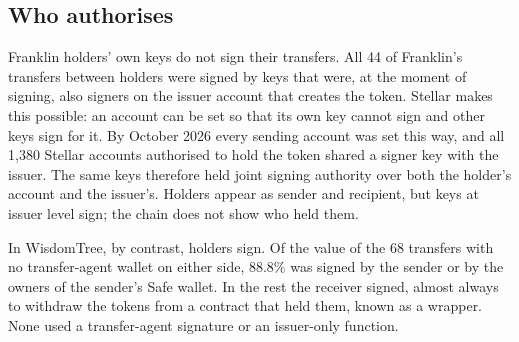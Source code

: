 \documentclass[12pt,a4paper]{article}
\begin{document}
\subsection{Who authorises}
Franklin holders' own keys do not sign their transfers. All 44 of Franklin's transfers between holders were signed by keys that were, at the moment of signing, also signers on the issuer account that creates the token. Stellar makes this possible: an account can be set so that its own key cannot sign and other keys sign for it. By October 2026 every sending account was set this way, and all 1{,}380 Stellar accounts authorised to hold the token shared a signer key with the issuer. The same keys therefore held joint signing authority over both the holder's account and the issuer's. Holders appear as sender and recipient, but keys at issuer level sign; the chain does not show who held them.

In WisdomTree, by contrast, holders sign. Of the value of the 68 transfers with no transfer-agent wallet on either side, 88.8\% was signed by the sender or by the owners of the sender's Safe wallet. In the rest the receiver signed, almost always to withdraw the tokens from a contract that held them, known as a wrapper. None used a transfer-agent signature or an issuer-only function.
\end{document}
